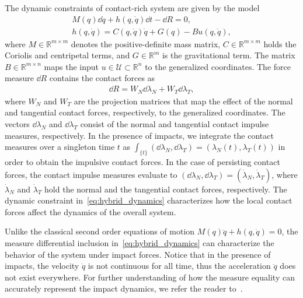 %
The dynamic constraints of contact-rich system are given by the
model~\cite{glocker2005formulation}
\begin{equation}
  \begin{gathered}
    M(q) \dd \dot{q} + h(q, \dot{q})\dd t - \dd R  = 0, \\
    h(q, \dot{q}) = C(q, \dot{q})\dot{q} + G(q) - Bu(q, \dot{q}), 
    \end{gathered}
  \label{eq:hybrid_dynamics}
\end{equation}
%
\noindent where $M \in \mathbb{R}^{m \times m}$ denotes the positive-definite
mass matrix, $C \in \mathbb{R}^{m \times m}$ holds the Coriolis and centripetal
terms, and $G \in \mathbb{R}^{m}$ is the gravitational term. The matrix $B \in
\mathbb{R}^{m \times n}$ maps the input $u \in \mathcal{U} \subset
\mathbb{R}^{n}$ to the generalized coordinates.
%
The force measure $\dd R$ contains the contact forces as 
\begin{align*}
    \dd R = W_N \dd \lambda_N + W_T \dd \lambda_T ,
\end{align*}
\noindent where $W_N$ and $W_T$ are the projection matrices that map the effect
of the normal and tangential contact forces, respectively, to the generalized
coordinates.
%
The vectors $\dd \lambda_N$ and $\dd \lambda_T$
consist of the normal and tangential contact impulse measures, respectively.
%
In the presence of impacts, we integrate the contact measures over a singleton
time $t$ as $\int_{\{t\}} (\dd \lambda_N , \dd \lambda_T) = (\lambda_N(t),
\lambda_T(t))$ in order to obtain the impulsive contact forces.
%
In the case of persisting contact forces, the contact impulse measures evaluate
to $(\dd \lambda_N, \dd \lambda_T) = (\dot{\lambda}_N, \dot{\lambda}_T)$, where
$\dot{\lambda}_N$ and $\dot{\lambda}_T$ hold the normal and the tangential contact
forces, respectively.
%
The dynamic constraint in~\eqref{eq:hybrid_dynamics} characterizes how the
local contact forces affect the dynamics of the overall system.
\begin{rem}
  Unlike the classical second order equations of motion $M(q) \ddot{q} + h(q,
  \dot{q}) = 0$, the measure differential inclusion
  in~\eqref{eq:hybrid_dynamics} can characterize the behavior of the system
  under impact forces. Notice that in the presence of impacts, the velocity
  $\dot{q}$ is not continuous for all time, thus the acceleration $\ddot{q}$
  does not exist everywhere. For further understanding of how the measure
  equality can accurately represent the impact dynamics, we refer the reader
  to~\cite{moreau1988unilateral}.
\end{rem}

